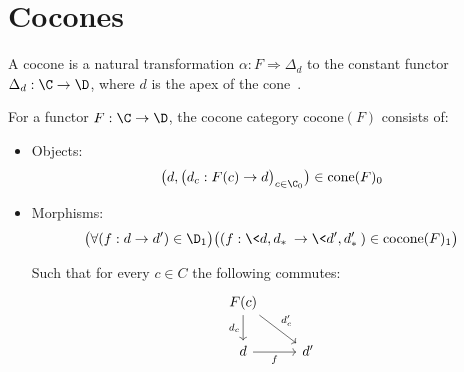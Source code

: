 \section{Cocones}

\begin{definition}[Cocone]
  A cocone is a natural transformation $\alpha: F \Rightarrow \Delta_d$ to the
	constant functor $\Delta_d:\C\to \D$, where $d$ is the apex of the
	cone~\parencite[p.~126]{leinster:basic_category_theory}.
\end{definition}

\begin{definition}
  For a functor $F:\C\to \D$, the cocone category $\mathrm{cocone}(F)$ consists
  of:

  \begin{itemize}
    \item Objects:
      \[\big(d, \big(d_c: F(c) \to d\big)_{c\in \C_0}\big)\in
        \mathrm{cone}(F)_0\]
    \item Morphisms:
      \[\big(\forall (f : d\to d')\in \D_1\big)
        \big((f:\<d, d_*\>\to \<d', d'_*\>)\in \mathrm{cocone}(F)_1\big)\]

      Such that for every $c\in C$ the following commutes:
      \[\begin{tikzcd}[ampersand replacement=\&]
        {F(c)} \\
        d \& {d'}
        \arrow["{d_c}"', from=1-1, to=2-1]
        \arrow["{d'_c}", from=1-1, to=2-2]
        \arrow["f"', from=2-1, to=2-2]
      \end{tikzcd}\]
  \end{itemize}
\end{definition}